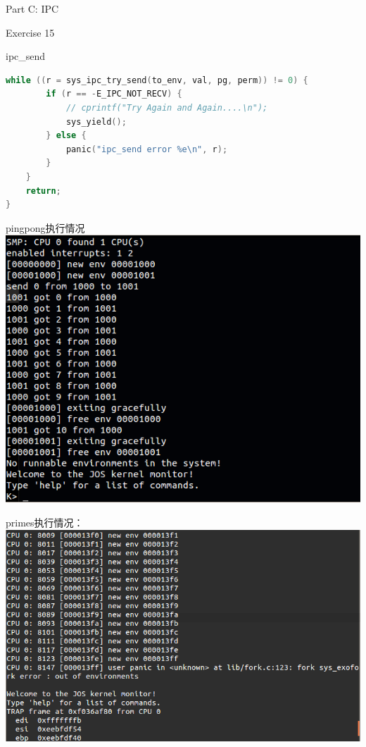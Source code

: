 \documentclass[GBK,winfonts,a4paper,10pt]{ctexart}
\begin{document}
\begin{section}{ Part C: IPC }
\begin{subsection}{ Exercise 15 }
\begin{subsection}{ ipc\_send }
\begin{lstlisting}[language = C]
	while ((r = sys_ipc_try_send(to_env, val, pg, perm)) != 0) {
		if (r == -E_IPC_NOT_RECV) {
			// cprintf("Try Again and Again....\n");
			sys_yield();
		} else {
			panic("ipc_send error %e\n", r);
		}
	}
	return;
}
\end{lstlisting}
\end{subsection}
\end{subsection}
\par
pingpong执行情况
\includegraphics[scale=0.5]{pingpong.png}
\par
primes执行情况：
\includegraphics[scale=0.5]{primes.png}


\end{section}
\end{document}
